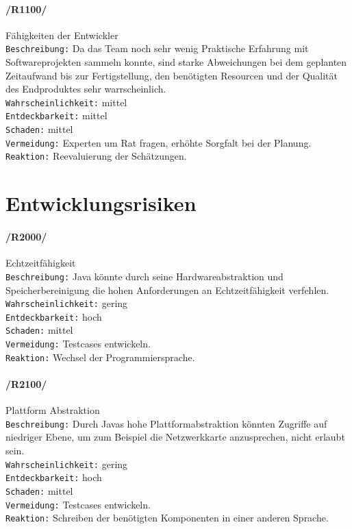 \paragraph{/R1100/}Fähigkeiten der Entwickler\\
\texttt{Beschreibung:} Da das Team noch sehr wenig Praktische Erfahrung mit
Softwareprojekten sammeln konnte, sind starke Abweichungen bei dem geplanten
Zeitaufwand bis zur Fertigstellung, den benötigten Resourcen und der Qualität des Endproduktes sehr warrscheinlich. \\ 
\texttt{Wahrscheinlichkeit:} mittel\\ 
\texttt{Entdeckbarkeit:} mittel\\
\texttt{Schaden:} mittel\\
\texttt{Vermeidung:} Experten um Rat fragen, erhöhte Sorgfalt bei der Planung.\\
\texttt{Reaktion:} Reevaluierung der Schätzungen.\\
 
 \section{Entwicklungsrisiken}
 \label{sec:devrisk}

 \paragraph{/R2000/}Echtzeitfähigkeit\\
 \texttt{Beschreibung:} Java könnte durch seine Hardwareabstraktion und
 Speicherbereinigung die hohen Anforderungen an Echtzeitfähigkeit verfehlen. \\ \texttt{Wahrscheinlichkeit:} gering\\
 \texttt{Entdeckbarkeit:} hoch\\
 \texttt{Schaden:} mittel\\
 \texttt{Vermeidung:} Testcases entwickeln. \\
 \texttt{Reaktion:} Wechsel der Programmiersprache.\\

 \paragraph{/R2100/}Plattform Abstraktion\\
 \texttt{Beschreibung:} Durch Javas hohe Plattformabstraktion könnten Zugriffe
 auf niedriger Ebene, um zum Beispiel die Netzwerkkarte anzusprechen, nicht
 erlaubt sein. \\ \texttt{Wahrscheinlichkeit:} gering\\ \texttt{Entdeckbarkeit:} hoch\\
 \texttt{Schaden:} mittel\\
 \texttt{Vermeidung:} Testcases entwickeln.\\
 \texttt{Reaktion:} Schreiben der benötigten Komponenten in einer anderen Sprache.\\

